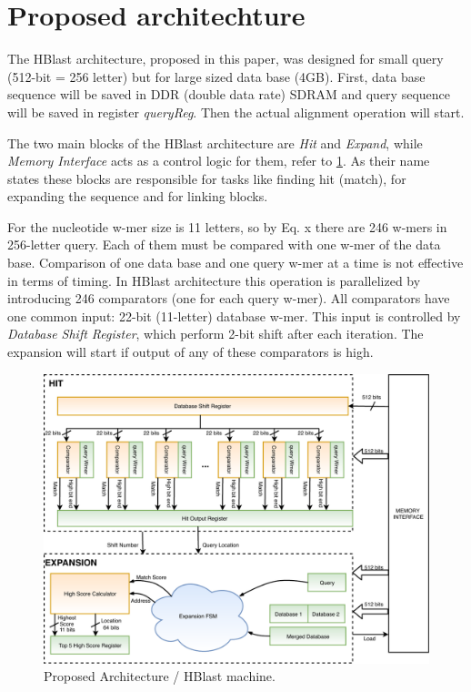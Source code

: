 \section{Proposed architechture}
\label{sec:propesedArch}

   The HBlast architecture, proposed in this paper, was designed for small query (512-bit = 256 letter) but for large sized data base (4GB).  First, data base sequence will be saved in DDR (double data rate) SDRAM and query sequence will be saved in register \textit{queryReg}. Then the actual alignment operation will start. 

The two main blocks of the HBlast architecture are \textit{Hit} and \textit{Expand}, while \textit{Memory Interface} acts as a control logic for them, refer to \ref{fig:blastArch}. As their name states these blocks are responsible for tasks like finding hit (match), for expanding the sequence and for linking blocks. 

For the nucleotide w-mer size is 11 letters, so by Eq. x there are 246 w-mers in 256-letter query. Each of them must be compared with one w-mer of the data base.  Comparison of one data base and one query w-mer at a time is not effective in terms of timing. In HBlast architecture this operation is parallelized by introducing 246 comparators (one for each query w-mer). All comparators have one common input: 22-bit (11-letter) database w-mer. This input is controlled by \textit{Database Shift Register}, which perform 2-bit shift after each iteration. The expansion will start if output of any of these comparators is high. 
\begin{figure}
\includegraphics[width=\textwidth]{Figures/BlastMachine.pdf}
\caption{Proposed Architecture / HBlast machine.} \label{fig:blastArch}
\end{figure}

